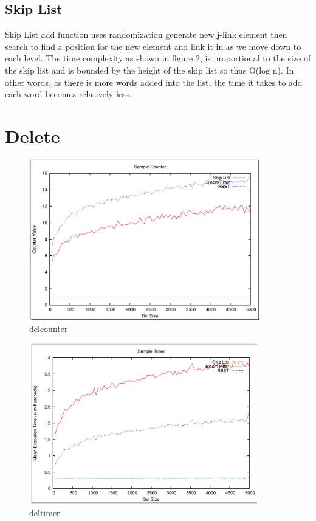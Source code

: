 \documentclass[11pt]{article}
\begin{document}
\subsection*{Skip List}
Skip List add function uses randomization
generate new j-link element then search to find a position for the new element
and link it in as we move down to each level. The time complexity as shown in figure 2, is proportional to the size of the skip list and is bounded by the height of the skip list so thus O(log n). In other words, as there is more words added into the list, the time it takes to add each word becomes relatively less.

\section{Delete}
\begin{figure}[ht]
\centering
\includegraphics[height=70mm,width=100mm]{delcounter.png}
\caption{delcounter}
\end{figure}
\begin{figure}[ht]
\centering
\includegraphics[height=70mm,width=100mm]{deltimer.png}
\caption{deltimer}
\end{figure}
\end{document}
